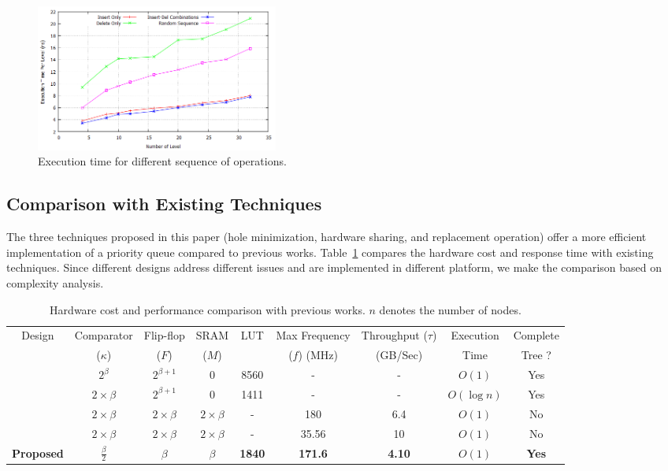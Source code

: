 \documentclass[10pt, conference, compsocconf]{IEEEtran}
\begin{document}
\begin{figure}[!ht]
  \centering
  \includegraphics[width=8.0cm]{Figures/random.png}
      \caption{Execution time for different sequence of operations.}
    \label{random}
\end{figure}

\subsection{Comparison with Existing Techniques}

The three techniques proposed in this paper (hole minimization, hardware sharing, and replacement operation) offer a more efficient implementation of a priority queue compared to previous works.
Table~\ref{table4} compares the hardware cost and response time with existing techniques.
Since different designs address different issues and are implemented in different platform, we make the comparison based on complexity analysis.

\begin{table}
 \begin{center}
 \caption{Hardware cost and performance comparison with previous works. $n$ denotes the number of nodes.}
\label{table4}
\begin{tabular}{ |c|c|c|c|c|c|c|c|c| }
 \hline
 Design  & Comparator  & Flip-flop & SRAM & LUT &Max Frequency & Throughput ($\tau$) & Execution & Complete \\
  & ($\kappa$)& ($F$)& ($M$) &  & ($f$) (MHz) & (GB/Sec) & Time & Tree ?\\
 \hline
 \hline
 \cite{hw8} & $2^\beta$ & $2^{\beta +1}$& 0 & 8560 & - & - & $O(1)$ & Yes\\
 \hline
 \cite{hw11} & $2 \times \beta$ & $2^{\beta +1}$ & 0 & 1411 & - & - & $O(\log n)$ & Yes\\
 \hline
 \cite{fpga1} & $2 \times \beta$ & $2 \times \beta$ & $2 \times \beta$ & - & 180 &6.4 & $O(1)$ & No\\
 \hline
 \cite{hw2} & $2 \times \beta$ & $2 \times \beta$ & $2 \times \beta$ & - & 35.56 &10 & $O(1)$ & No\\
 \hline
{\bf Proposed} & {\bf $\frac{\beta}{2}$} & {\bf $\beta$} & {\bf $\beta$} & {\bf 1840} & {\bf 171.6} & {\bf 4.10} & {\bf $O(1)$} & {\bf Yes}\\
 \hline
\end{tabular}
\end{center}
\end{table}
\end{document}
